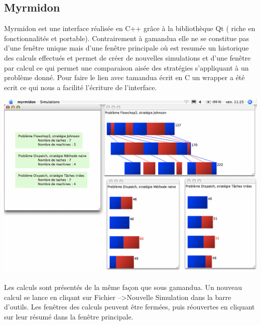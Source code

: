 \subsection{Myrmidon}
Myrmidon est une interface réalisée en C++ grâce à la bibliothèque Qt ( riche en fonctionnalités et portable). Contrairement à gamandua elle ne se constitue pas d'une fenêtre unique mais d'une fenêtre principale où est resumée un historique des calculs effectués et permet de créer de nouvelles simulations et d'une fenêtre par calcul ce qui permet une comparaison aisée des stratégies s'appliquant à un problème donné.
Pour faire le lien avec tamandua écrit en C un wrapper a été ecrit ce qui nous a facilité l'écriture de l'interface.
\begin{center}
\includegraphics{myrmidon.png}
\end{center}
Les calculs sont présentés de la même façon que sous gamandua. Un nouveau calcul se lance en cliqant sur Fichier --\textgreater Nouvelle Simulation dans la barre d'outils.
Les fenêtres des calculs peuvent être fermées, puis réouvertes en cliquant sur leur résumé dans la fenêtre principale.